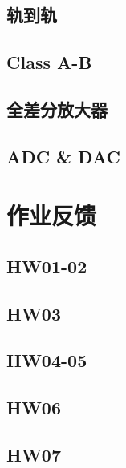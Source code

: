 \documentclass[cn,11pt,english,black,simple,device=ppt]{elegantbook}
\begin{document}
\chapter{轨到轨}



\chapter{Class A-B}

\chapter{全差分放大器}



\chapter{ADC \& DAC} 

 

\part{作业反馈}

\chapter{HW01-02}

 

\chapter{HW03}

 

\chapter{HW04-05}

 

\chapter{HW06}

 

\chapter{HW07}
\end{document}
